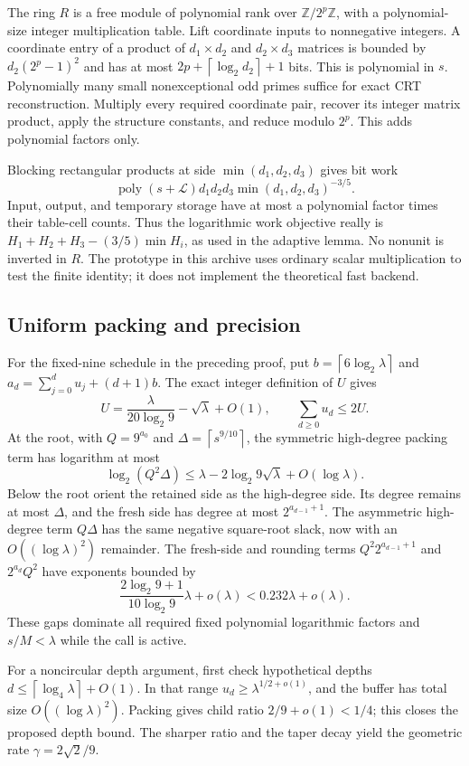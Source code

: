 \documentclass[11pt,letterpaper]{article}
\theoremstyle{remark}\newtheorem{remark}[theorem]{Remark}
\newcommand{\poly}{\operatorname{poly}}
\newcommand{\ceil}[1]{\left\lceil #1\right\rceil}
\begin{document}
The ring $R$ is a free module of polynomial rank over
$\mathbb Z/2^p\mathbb Z$, with a polynomial-size integer multiplication
table. Lift coordinate inputs to nonnegative integers. A coordinate entry
of a product of $d_1\times d_2$ and $d_2\times d_3$ matrices is bounded by
$d_2(2^p-1)^2$ and has at most $2p+\ceil{\log_2d_2}+1$ bits. This is
polynomial in $s$. Polynomially many small nonexceptional odd primes suffice
for exact CRT reconstruction. Multiply every required coordinate pair,
recover its integer matrix product, apply the structure constants, and
reduce modulo $2^p$. This adds polynomial factors only.

Blocking rectangular products at side $\min(d_1,d_2,d_3)$ gives bit work
\[
 \poly(s+\mathcal L)d_1d_2d_3\min(d_1,d_2,d_3)^{-3/5}.
\]
Input, output, and temporary storage have at most a polynomial factor times
their table-cell counts. Thus the logarithmic work objective really is
$H_1+H_2+H_3-(3/5)\min H_i$, as used in the adaptive lemma. No nonunit
is inverted in $R$. The prototype in this archive uses ordinary scalar
multiplication to test the finite identity; it does not implement the
theoretical fast backend.

\subsection{Uniform packing and precision}

For the fixed-nine schedule in the preceding proof, put
$b=\ceil{6\log_2\lambda}$ and $a_d=\sum_{j=0}^d u_j+(d+1)b$.
The exact integer definition of $U$ gives
\[
 U=\frac{\lambda}{20\log_2 9}-\sqrt\lambda+O(1),
 \qquad \sum_{d\ge0}u_d\le2U.
\]
At the root, with $Q=9^{a_0}$ and $\Delta=\ceil{s^{9/10}}$,
the symmetric high-degree packing term has logarithm at most
\[
 \log_2(Q^2\Delta)
 \le\lambda-2\log_2 9\sqrt\lambda+O(\log\lambda).
\]
Below the root orient the retained side as the high-degree side. Its
degree remains at most $\Delta$, and the fresh side has degree at most
$2^{a_{d-1}+1}$. The asymmetric high-degree term $Q\Delta$ has the same
negative square-root slack, now with an $O((\log\lambda)^2)$ remainder.
The fresh-side and rounding terms $Q^2 2^{a_{d-1}+1}$ and $2^{a_d}Q^2$
have exponents bounded by
\[
 \frac{2\log_2 9+1}{10\log_2 9}\lambda+o(\lambda)
 <0.232\lambda+o(\lambda).
\]
These gaps dominate all required fixed polynomial logarithmic factors and
$s/M<\lambda$ while the call is active.

For a noncircular depth argument, first check hypothetical depths
$d\le\ceil{\log_4\lambda}+O(1)$. In that range
$u_d\ge\lambda^{1/2+o(1)}$, and the buffer has total size
$O((\log\lambda)^2)$. Packing gives child ratio $2/9+o(1)<1/4$;
this closes the proposed depth bound. The sharper ratio and the taper
decay yield the geometric rate $\gamma=2\sqrt2/9$.
\end{document}
